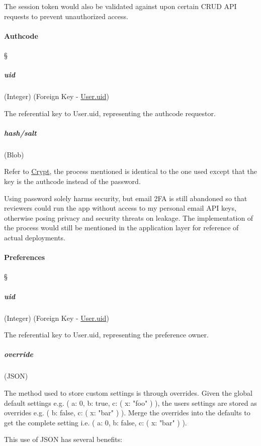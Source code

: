 The session token would also be validated against upon certain CRUD API requests
to prevent unauthorized access.

\paragraph{Authcode \textdagger{}}
\S{} \label{data-layer.design.user.tables.code}

\subparagraph{uid}
(Integer) (Foreign Key - \hyperref[data-layer.design.user.tables.user.uid]{User.uid})
\label{data-layer.design.user.tables.code.uid}

The referential key to User.uid, representing the authcode requestor.

\subparagraph{hash/salt}
(Blob) \label{data-layer.design.user.tables.code.crypt}

Refer to \hyperref[data-layer.design.user.tables.pswd.crypt]{Crypt}, the process
mentioned is identical to the one used except that the key is the authcode instead
of the password.

\textdagger{} Using password solely harms security, but email 2FA is still abandoned
so that reviewers could run the app without access to my personal email API keys,
otherwise posing privacy and security threats on leakage. The implementation of the
process would still be mentioned in the application layer for reference of actual
deployments.

\paragraph{Preferences \textdagger{}}
\S{} \label{data-layer.design.user.tables.pref}

\subparagraph{uid}
(Integer) (Foreign Key -
\hyperref[data-layer.design.user.tables.user.uid]{User.uid}) \label{data-layer.design.user.tables.pref.uid}

The referential key to User.uid, representing the preference owner.

\subparagraph{override}
(JSON) \label{data-layer.design.user.tables.pref.override}

The method used to store custom settings is through overrides. Given the global
default settings e.g. ( a: 0, b: true, c: ( x: "foo" ) ), the users settings are
stored as overrides e.g. ( b: false, c: ( x: "bar" ) ). Merge the overrides into
the defaults to get the complete setting i.e. ( a: 0, b: false, c: ( x: "bar" ) ).

This use of JSON has several benefits:

